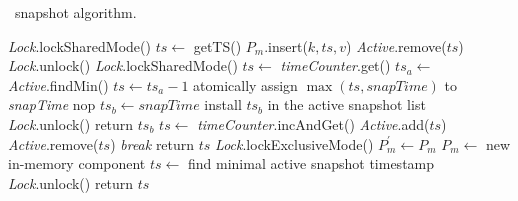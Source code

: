 \begin{algorithm} [t]
\small
\caption{\small  \clsm\ snapshot algorithm.}
\label{alg:snap}
%
\begin{algorithmic}[1]
\makeatletter\setcounter{ALG@line}{0}\makeatother
%
    \State \emph{Lock}.lockSharedMode()
		\State $ts \gets$ getTS()
    \State $P_{m}$.insert($k,ts,v$)
    \State \emph{Active}.remove($ts$)
    \State \emph{Lock}.unlock()
\EndProcedure
%
\vspace{3pt}
%
%
    \State \emph{Lock}.lockSharedMode()
    \State $ts \gets$ \emph{timeCounter}.get()
    \State $ts_a \gets$ \emph{Active}.findMin() \label{code:active:ts}
     $ts \gets ts_a - 1$ \EndIf \label{code:snap:ts}
    \State atomically assign $\max(ts, snapTime)$ to \emph{snapTime}  \label{LineSnapTime}
     nop
    \label{code:snap:blocking} \EndWhile \State $ts_b \gets snapTime$
    \State install $ts_b$ in the active snapshot list
    \State \emph{Lock}.unlock()
    \State return $ts_b$
\EndProcedure
%
\vspace{3pt}
%
			\State $ts \gets$ \emph{timeCounter}.incAndGet()
			\State \emph{Active}.add($ts$)
			 	\emph{Active}.remove($ts$) \Else \emph{
			break} \EndIf
		\EndWhile
		\State return $ts$
\EndProcedure
\vspace{3pt}
%
   \State \emph{Lock}.lockExclusiveMode()
   \State $P_{m}^{'} \gets P_{m}$
   \State $P_{m} \gets$ new in-memory component
   \State $ts \gets$ find minimal active snapshot timestamp
   \State \emph{Lock}.unlock()
   \State return $ts$
\EndProcedure
%

\end{algorithmic}
\label{Al:snapAlg}
\end{algorithm}

